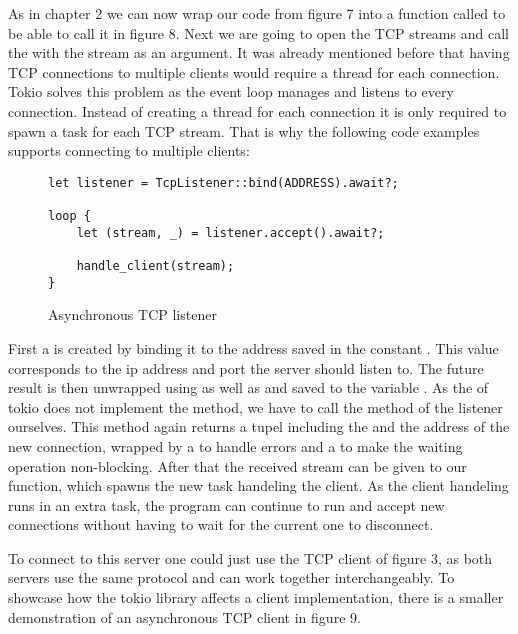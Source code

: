 As in chapter 2 we can now wrap our code from figure 7 into a function called  to be able to call
it in figure 8. Next we are going to open the TCP streams and call the  with the stream as an
argument. It was already mentioned before that having TCP connections to multiple clients would require a thread for
each connection. Tokio solves this problem as the event loop manages and listens to every connection. Instead of
creating a thread for each connection it is only required to spawn a task for each TCP stream. That is why the
following code examples supports connecting to multiple clients:

\begin{figure}[ht]
    \begin{verbatim}
let listener = TcpListener::bind(ADDRESS).await?;

loop {
    let (stream, _) = listener.accept().await?;

    handle_client(stream);
}
    \end{verbatim}
    \caption{Asynchronous TCP listener}
\end{figure}

First a  is created by binding it to the address saved in the  constant
. This value corresponds to the ip address and port the server should listen to. The future result is
then unwrapped using  as well as  and saved to the variable . As the
 of tokio does not implement the  method, we have to call the  method of
the listener ourselves. This method again returns a tupel including the  and the address of the new
connection, wrapped by a  to handle errors and a  to make the waiting operation non-blocking.
After that the received stream can be given to our  function, which spawns the new task handeling
the client. As the client handeling runs in an extra task, the program can continue to run and accept new connections
without having to wait for the current one to disconnect.

To connect to this server one could just use the TCP client of figure 3, as both servers use the same protocol and can
work together interchangeably. To showcase how the tokio library affects a client implementation, there is a smaller
demonstration of an asynchronous TCP client in figure 9.

